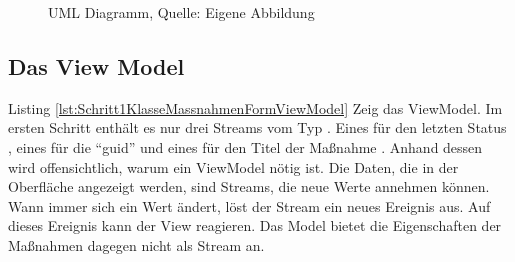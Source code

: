 \ifincludeall
  \begin{figure}[h]
    \centering


    \caption[UML Diagramm]{UML Diagramm, Quelle: Eigene Abbildung}
    \label{lst:UmlOnSelet}

  \end{figure}%
\fi







\subsection{ Das View Model }

Listing \ref{lst:Schritt1KlasseMassnahmenFormViewModel} Zeig das ViewModel.
Im ersten Schritt enthält es nur drei Streams vom Typ .
Eines für den letzten Status , eines für die \enquote{guid}  und eines für den Titel der Maßnahme .
Anhand dessen wird offensichtlich, warum ein ViewModel nötig ist.
Die Daten, die in der Oberfläche angezeigt werden, sind Streams, die neue Werte annehmen können.
Wann immer sich ein Wert ändert, löst der Stream ein neues Ereignis aus.
Auf dieses Ereignis kann der View reagieren.
Das Model bietet die Eigenschaften der Maßnahmen dagegen nicht als Stream an.

